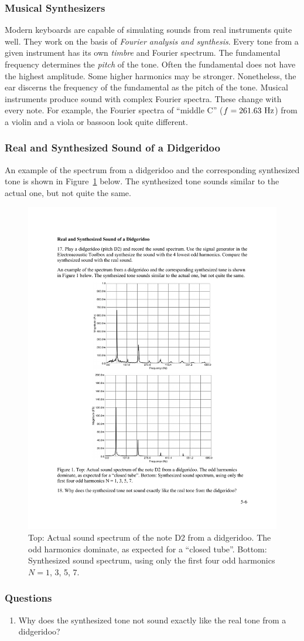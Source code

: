 \documentclass[11pt]{NSF}
\def\ben{\begin{enumerate}}
\def\een{\end{enumerate}}
\def\i{\item{}}
\begin{document}
\subsubsection{Musical Synthesizers}

Modern keyboards are capable of simulating sounds from real 
instruments quite well. 
They work on the basis of {\em Fourier analysis and synthesis}. 
Every tone from a given instrument has its own {\em timbre} 
and Fourier spectrum. 
The fundamental frequency determines the {\em pitch} of the tone. 
Often the fundamental does not have the highest amplitude. 
Some higher harmonics may be stronger. 
Nonetheless, the ear discerns the frequency of the fundamental 
as the pitch of the tone. 
Musical instruments produce sound with complex Fourier spectra. 
These change with every note. 
For example, the Fourier spectra of ``middle C” ($f = 261.63~{\rm Hz}$) 
from a violin and a viola or bassoon look quite different.

\subsubsection{Real and Synthesized Sound of a Didgeridoo}

An example of the spectrum from a didgeridoo and the 
corresponding synthesized tone is shown in Figure~\ref{f:1} below. 
The synthesized tone sounds similar to the actual one, but not quite the same.
%
\begin{figure}[hbtp]
\begin{center}
\includegraphics[width=.7\textwidth]{fig5_1}
\caption{Top: Actual sound spectrum of the note D2 from a didgeridoo. 
The odd harmonics dominate, as expected for a ``closed tube”. 
Bottom: Synthesized sound spectrum, using only the first four odd harmonics 
$N = 1$, 3, 5, 7.}
\label{f:1} 
\end{center} 
\end{figure}
%

\subsubsection*{Questions}
\ben
\i Why does the synthesized tone not sound
exactly like the real tone from a didgeridoo?
\een
\end{document}
